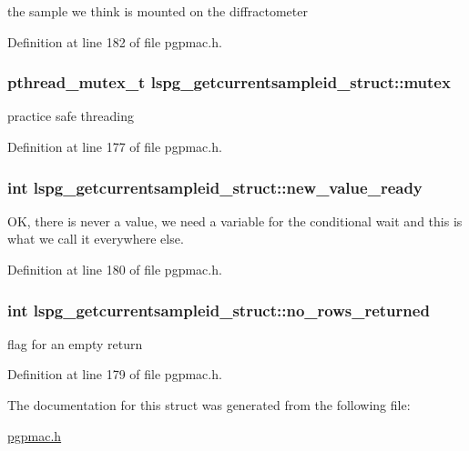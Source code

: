 the sample we think is mounted on the diffractometer 



Definition at line 182 of file pgpmac.\-h.

\hypertarget{structlspg__getcurrentsampleid__struct_ace54acbdcbce620437962858ba04e256}{
\subsubsection[{mutex}]{\setlength{\rightskip}{0pt plus 5cm}pthread\-\_\-mutex\-\_\-t lspg\-\_\-getcurrentsampleid\-\_\-struct\-::mutex}}\label{structlspg__getcurrentsampleid__struct_ace54acbdcbce620437962858ba04e256}


practice safe threading 



Definition at line 177 of file pgpmac.\-h.

\hypertarget{structlspg__getcurrentsampleid__struct_ada3840f03195ee1807150f1e75fd3775}{
\subsubsection[{new\-\_\-value\-\_\-ready}]{\setlength{\rightskip}{0pt plus 5cm}int lspg\-\_\-getcurrentsampleid\-\_\-struct\-::new\-\_\-value\-\_\-ready}}\label{structlspg__getcurrentsampleid__struct_ada3840f03195ee1807150f1e75fd3775}


O\-K, there is never a value, we need a variable for the conditional wait and this is what we call it everywhere else. 



Definition at line 180 of file pgpmac.\-h.

\hypertarget{structlspg__getcurrentsampleid__struct_a06758730db55730eb10d2d63e2520d71}{
\subsubsection[{no\-\_\-rows\-\_\-returned}]{\setlength{\rightskip}{0pt plus 5cm}int lspg\-\_\-getcurrentsampleid\-\_\-struct\-::no\-\_\-rows\-\_\-returned}}\label{structlspg__getcurrentsampleid__struct_a06758730db55730eb10d2d63e2520d71}


flag for an empty return 



Definition at line 179 of file pgpmac.\-h.



The documentation for this struct was generated from the following file\-:\begin{DoxyCompactItemize}
\item 
\hyperlink{pgpmac_8h}{pgpmac.\-h}\end{DoxyCompactItemize}
